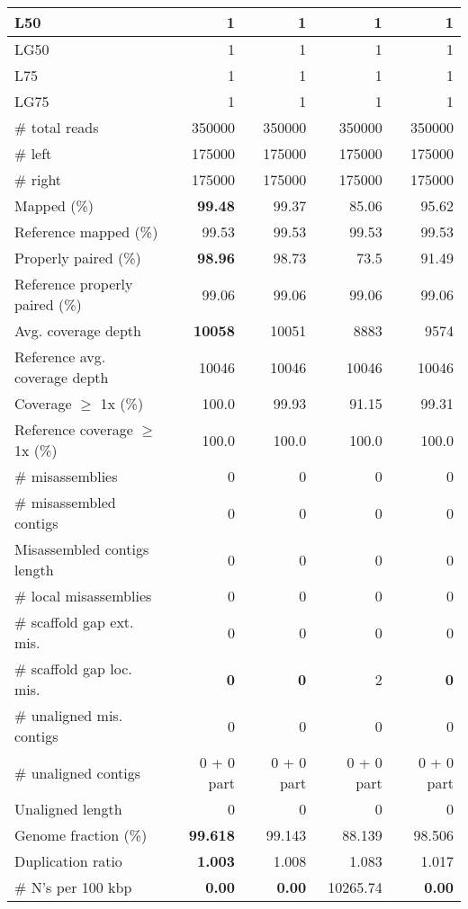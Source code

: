 \documentclass[12pt,a4paper]{article}
\begin{document}
\begin{table}[ht]
\begin{center}
\begin{tabular}{|l*{4}{|r}|}
L50 & 1 & 1 & 1 & 1 \\ \hline
LG50 & 1 & 1 & 1 & 1 \\ \hline
L75 & 1 & 1 & 1 & 1 \\ \hline
LG75 & 1 & 1 & 1 & 1 \\ \hline
\# total reads & 350000 & 350000 & 350000 & 350000 \\ \hline
\# left & 175000 & 175000 & 175000 & 175000 \\ \hline
\# right & 175000 & 175000 & 175000 & 175000 \\ \hline
Mapped (\%) & {\bf 99.48} & 99.37 & 85.06 & 95.62 \\ \hline
Reference mapped (\%) & 99.53 & 99.53 & 99.53 & 99.53 \\ \hline
Properly paired (\%) & {\bf 98.96} & 98.73 & 73.5 & 91.49 \\ \hline
Reference properly paired (\%) & 99.06 & 99.06 & 99.06 & 99.06 \\ \hline
Avg. coverage depth & {\bf 10058} & 10051 & 8883 & 9574 \\ \hline
Reference avg. coverage depth & 10046 & 10046 & 10046 & 10046 \\ \hline
Coverage $\geq$ 1x (\%) & 100.0 & 99.93 & 91.15 & 99.31 \\ \hline
Reference coverage $\geq$ 1x (\%) & 100.0 & 100.0 & 100.0 & 100.0 \\ \hline
\# misassemblies & 0 & 0 & 0 & 0 \\ \hline
\# misassembled contigs & 0 & 0 & 0 & 0 \\ \hline
Misassembled contigs length & 0 & 0 & 0 & 0 \\ \hline
\# local misassemblies & 0 & 0 & 0 & 0 \\ \hline
\# scaffold gap ext. mis. & 0 & 0 & 0 & 0 \\ \hline
\# scaffold gap loc. mis. & {\bf 0} & {\bf 0} & 2 & {\bf 0} \\ \hline
\# unaligned mis. contigs & 0 & 0 & 0 & 0 \\ \hline
\# unaligned contigs & 0 + 0 part & 0 + 0 part & 0 + 0 part & 0 + 0 part \\ \hline
Unaligned length & 0 & 0 & 0 & 0 \\ \hline
Genome fraction (\%) & {\bf 99.618} & 99.143 & 88.139 & 98.506 \\ \hline
Duplication ratio & {\bf 1.003} & 1.008 & 1.083 & 1.017 \\ \hline
\# N's per 100 kbp & {\bf 0.00} & {\bf 0.00} & 10265.74 & {\bf 0.00} \\ \hline

\end{tabular}
\end{center}
\end{table}
\end{document}
